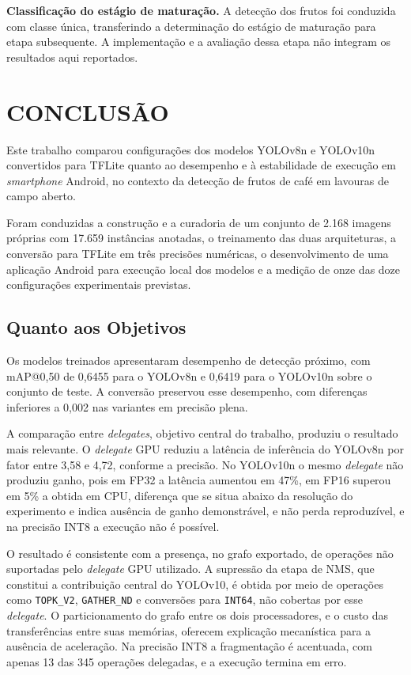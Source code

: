 \documentclass[artigo,times,capa]{iftex2024}
\begin{document}
\textbf{Classificação do estágio de maturação.} A detecção dos frutos foi conduzida com classe única, transferindo a determinação do estágio de maturação para etapa subsequente. A implementação e a avaliação dessa etapa não integram os resultados aqui reportados.

\FloatBarrier

\section{CONCLUSÃO}
\label{sec:conclusao}

Este trabalho comparou configurações dos modelos YOLOv8n e YOLOv10n convertidos para \ac{TFLite} quanto ao desempenho e à estabilidade de execução em \textit{smartphone} Android, no contexto da detecção de frutos de café em lavouras de campo aberto.

Foram conduzidas a construção e a curadoria de um conjunto de 2.168 imagens próprias com 17.659 instâncias anotadas, o treinamento das duas arquiteturas, a conversão para \ac{TFLite} em três precisões numéricas, o desenvolvimento de uma aplicação Android para execução local dos modelos e a medição de onze das doze configurações experimentais previstas.

\subsection{Quanto aos Objetivos}

Os modelos treinados apresentaram desempenho de detecção próximo, com \ac{mAP}@0,50 de 0,6455 para o YOLOv8n e 0,6419 para o YOLOv10n sobre o conjunto de teste. A conversão preservou esse desempenho, com diferenças inferiores a 0,002 nas variantes em precisão plena.

A comparação entre \textit{delegates}, objetivo central do trabalho, produziu o resultado mais relevante. O \textit{delegate} \ac{GPU} reduziu a latência de inferência do YOLOv8n por fator entre 3,58 e 4,72, conforme a precisão. No YOLOv10n o mesmo \textit{delegate} não produziu ganho, pois em \ac{FP32} a latência aumentou em 47\%, em \ac{FP16} superou em 5\% a obtida em \ac{CPU}, diferença que se situa abaixo da resolução do experimento e indica ausência de ganho demonstrável, e não perda reproduzível, e na precisão \ac{INT8} a execução não é possível.

O resultado é consistente com a presença, no grafo exportado, de operações não suportadas pelo \textit{delegate} \ac{GPU} utilizado. A supressão da etapa de \ac{NMS}, que constitui a contribuição central do YOLOv10, é obtida por meio de operações como \texttt{TOPK\_V2}, \texttt{GATHER\_ND} e conversões para \texttt{INT64}, não cobertas por esse \textit{delegate}. O particionamento do grafo entre os dois processadores, e o custo das transferências entre suas memórias, oferecem explicação mecanística para a ausência de aceleração. Na precisão \ac{INT8} a fragmentação é acentuada, com apenas 13 das 345 operações delegadas, e a execução termina em erro.
\end{document}
